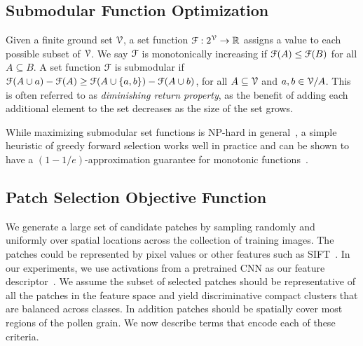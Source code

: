 \documentclass[10pt,twocolumn,letterpaper]{article}
\def\RB{{\mathbb R}}
\begin{document}
\subsection{Submodular Function Optimization}

Given a finite ground set $\cal V$, a set function ${\cal F}: 2^{\cal V}
\rightarrow \RB$ assigns a value to each possible subset of $\cal V$.
We say ${\cal F}$ is monotonically increasing if ${\cal F}(A) \le {\cal F}(B)$
for all $A \subseteq B$.  A set function ${\cal F}$ is submodular if ${\cal
F}(A\cup a) - {\cal F}(A) \ge {\cal F}(A\cup \{a, b \}) - {\cal F}(A\cup b) $,
for all $A \subseteq {\cal V}$ and $a, b \in {\cal V}/A$.
This is often referred to as {\em diminishing return property}, as the benefit
of adding each additional element to the set decreases as the size of the set
grows.

While maximizing submodular set functions is NP-hard in
general~\cite{cornuejols1983uncapacitated}, a simple heuristic of greedy
forward selection works well in practice and can be shown to have a
$(1-1/e)$-approximation guarantee for monotonic
functions~\cite{cornuejols1983uncapacitated,nemhauser1978analysis}.

%

\subsection{Patch Selection Objective Function}
We generate a large set of candidate patches by sampling randomly and uniformly over spatial
locations across the collection of training images.  The patches could be
represented by pixel values or other features such as
SIFT~\cite{lowe2004distinctive}.  In our experiments, we use activations from
a pretrained CNN as our feature descriptor~\cite{krizhevsky2012imagenet,simonyan2014very}.
We assume the subset of selected patches should be representative of all the
patches in the feature space and yield discriminative compact clusters that are
balanced across classes. In addition patches should be spatially cover most
regions of the pollen grain. We now describe terms that encode each of these
criteria.
\end{document}
